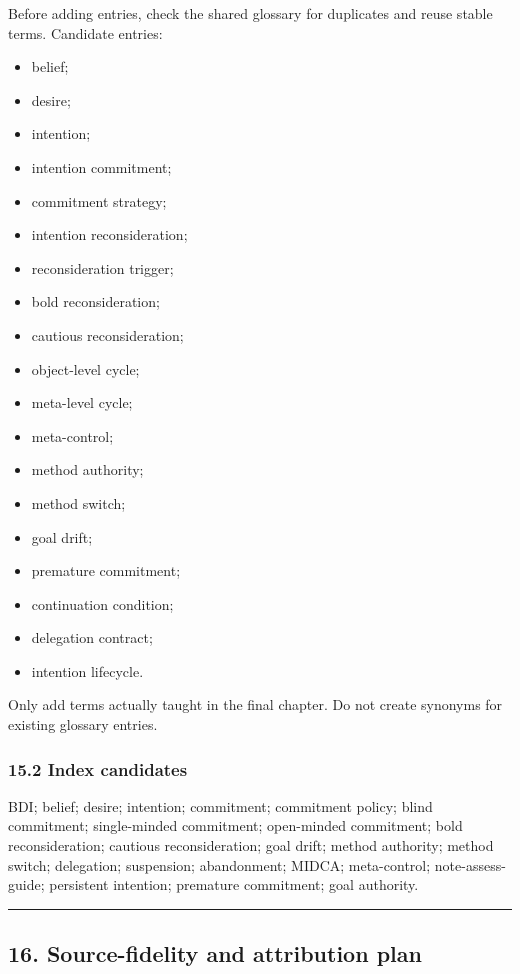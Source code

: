 Before adding entries, check the shared glossary for duplicates and reuse stable terms. Candidate entries:

\begin{itemize}
\tightlist
\item
  belief;
\item
  desire;
\item
  intention;
\item
  intention commitment;
\item
  commitment strategy;
\item
  intention reconsideration;
\item
  reconsideration trigger;
\item
  bold reconsideration;
\item
  cautious reconsideration;
\item
  object-level cycle;
\item
  meta-level cycle;
\item
  meta-control;
\item
  method authority;
\item
  method switch;
\item
  goal drift;
\item
  premature commitment;
\item
  continuation condition;
\item
  delegation contract;
\item
  intention lifecycle.
\end{itemize}

Only add terms actually taught in the final chapter. Do not create synonyms for existing glossary entries.

\subsubsection{15.2 Index candidates}\label{index-candidates}

BDI; belief; desire; intention; commitment; commitment policy; blind commitment; single-minded commitment; open-minded commitment; bold reconsideration; cautious reconsideration; goal drift; method authority; method switch; delegation; suspension; abandonment; MIDCA; meta-control; note-assess-guide; persistent intention; premature commitment; goal authority.

\begin{center}\rule{0.5\linewidth}{0.5pt}\end{center}

\subsection{16. Source-fidelity and attribution plan}\label{source-fidelity-and-attribution-plan}

